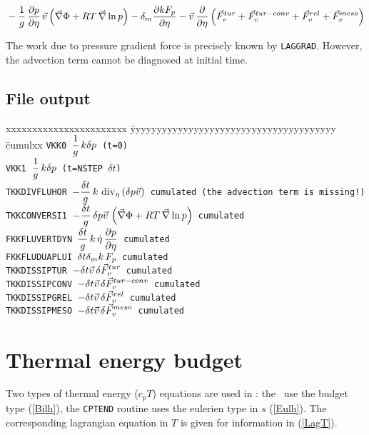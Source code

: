 $$ \mb - \frac 1g \,\DerP p{\eta} \,\vec v \lp \grad \Phi + RT\,\grad \ln p \rp - \delta_m \DerP{k\fp{}}{\eta} 
- \vec v \,\DerP{}{\eta} \lp \vec F_v^{tur} + \vec F_v^{tur-conv} + \vec F_v^{rel}+ \vec F_v^{meso}  \rp $$

The work due to pressure gradient force is precisely known by {\tt LAGGRAD}. However, the advection term cannot be diagnosed at initial time.
\subsection*{File output}

\begin{tabbing}
xxxxxxxxxxxxxxxxxxxxxxx \= yyyyyyyyyyyyyyyyyyyyyyyyyyyyyyyyyyyyyyy \= cumulxx \kill
\tt VKK0 \> $\displaystyle \frac 1g \, k \delta p$ (t=0) \\[1ex]
\tt VKK1 \> $\displaystyle \frac 1g \, k \delta p$ (t=NSTEP $\delta t$) \\[1ex]
\tt TKKDIVFLUHOR \> $\displaystyle -\frac{\delta t}g\, k \,\mathop{\rm div}\nolimits_{\eta}\left( \delta p \vec v \right)$ \> cumulated (the advection term is missing!) \\[1ex]
\tt TKKCONVERSI1 \> $\displaystyle -\frac{\delta t}g \,\delta p \vec v\,\left( \vec{\nabla} \Phi + RT\,\vec{\nabla} \ln p \right)$ \> cumulated\\[1ex]
\tt FKKFLUVERTDYN \> $\displaystyle \frac{\delta t}g \,k\,\dot\eta\,\frac{\displaystyle \partial p}{\displaystyle \partial \eta}$ \> cumulated\\[1ex]
\tt FKKFLUDUAPLUI \> $\delta t \delta_m k\,F_{p}$ \> cumulated\\
\tt TKKDISSIPTUR \> $\displaystyle -\delta t \vec v\,\delta \vec F_v^{tur}$ \> cumulated\\
\tt TKKDISSIPCONV \> $\displaystyle -\delta t \vec v\,\delta \vec F_v^{tur-conv}$ \> cumulated\\
\tt TKKDISSIPGREL \> $\displaystyle -\delta t \vec v\,\delta \vec F_v^{rel}$ \> cumulated\\
\tt TKKDISSIPMESO \> $\displaystyle -\delta t \vec v\,\delta \vec F_v^{meso}$ \> cumulated
\end{tabbing}

\section{Thermal energy budget}

Two types of thermal energy ($c_p T$) equations are used in \ARP: the \ddh\ use the budget type (\ref{Bilh}), the {\tt CPTEND} routine uses the eulerien type in $s$ (\ref{Eulh}). The corresponding lagrangian equation in $T$ is given for information in (\ref{LagT}). 

